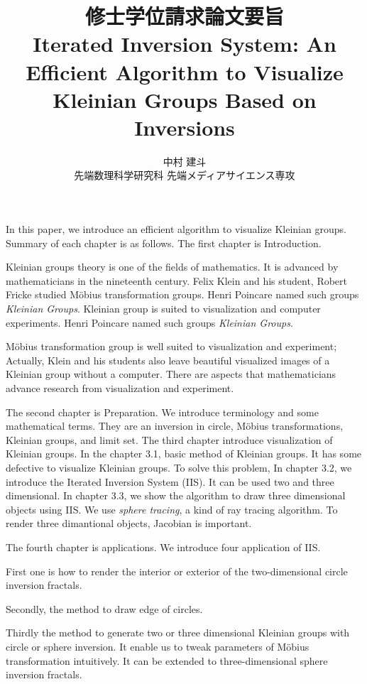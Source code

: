 \documentclass[uplatex, dvipdfmx]{article}
\title{修士学位請求論文要旨\\
 Iterated Inversion System: An Efficient Algorithm to Visualize Kleinian Groups Based on Inversions }
\author{中村 建斗\\
先端数理科学研究科 先端メディアサイエンス専攻\\
}
\date{}
\begin{document}
\maketitle
\pagestyle{plain}
\newpage

In this paper, we introduce an efficient algorithm to visualize Kleinian
groups. Summary of each chapter is as follows.
The first chapter is Introduction. 

Kleinian groups theory is one of the fields of mathematics.
It is advanced by mathematicians in the nineteenth century.
Felix Klein and his student, Robert Fricke studied M\"obius
transformation groups.
Henri Poincare named such groups \textit{Kleinian Groups}.
Kleinian group is suited to visualization and computer experiments.
Henri Poincare named such groups \textit{Kleinian Groups}.

M\"obius transformation group is well suited to visualization and
experiment; Actually, Klein and his students also leave beautiful
visualized images of a Kleinian group without a computer.
There are aspects that mathematicians advance research from
visualization and experiment.



The second chapter is Preparation.
We introduce terminology and some mathematical terms.
They are an inversion in circle, 
M\"obius transformations, Kleinian groups, and limit set.
The third chapter introduce visualization of Kleinian groups.
In the chapter 3.1, basic method of Kleinian groups.
It has some defective to visualize Kleinian groups.
To solve this problem,
In chapter 3.2, we introduce the Iterated Inversion System (IIS).
It can be used two and three dimensional.
In chapter 3.3, we show the algorithm to draw three dimensional
objects using IIS.
We use \textit{sphere tracing}, a kind of ray tracing algorithm.
To render three dimantional objects, Jacobian is important.


The fourth chapter is applications.
We introduce four application of IIS.

First one is how to render the interior or exterior of the
two-dimensional circle inversion fractals.

Secondly, the method to draw edge of circles.

Thirdly
the method to generate two or three dimensional Kleinian groups with
circle or sphere inversion. It enable us to tweak parameters of M\"obius
transformation intuitively.
It can be extended to three-dimensional sphere inversion fractals.
\end{document}
